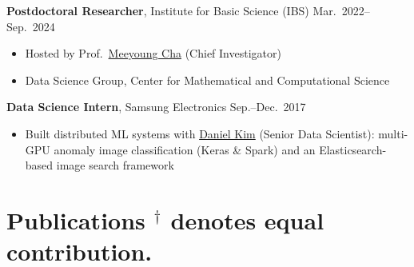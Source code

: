 \documentclass[11pt,letterpaper]{article}
\begin{document}
\vspace{4pt}
\noindent\textbf{Postdoctoral Researcher}, Institute for Basic Science (IBS) \hfill Mar.\ 2022--Sep.\ 2024
\begin{itemize}
    \item Hosted by Prof.\ \href{https://www.linkedin.com/in/miacha/}{Meeyoung Cha} (Chief Investigator)
    \item Data Science Group, Center for Mathematical and Computational Science
\end{itemize}

\vspace{4pt}
\noindent\textbf{Data Science Intern}, Samsung Electronics \hfill Sep.--Dec.\ 2017
\begin{itemize}
    \item Built distributed ML systems with \href{https://www.linkedin.com/in/danielyounghokim/}{Daniel Kim} (Senior Data Scientist): multi-GPU anomaly image classification (Keras \& Spark) and an Elasticsearch-based image search framework
\end{itemize}

\section{\texorpdfstring{Publications \hfill {\normalfont\small $^\dagger$ denotes equal contribution.}}{Publications}}
\end{document}
